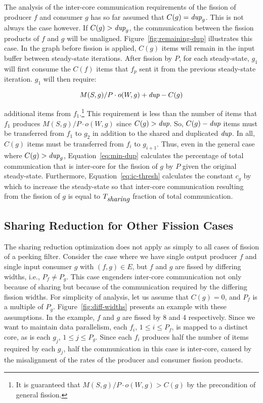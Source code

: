 The analysis of the inter-core communication requirements of the
fission of producer $f$ and consumer $g$ has so far assumed that $C(g)
= \mbox{\it dup}_g $.  This is not always the case however.  If $C(g) >
\mbox{\it dup}_g$, the communication between the fission products of $f$ and
$g$ will be unaligned.  Figure~\ref{fig:remaining-dup} illustrates
this case.  In the graph before fission is applied, $C(g)$ items will
remain in the input buffer between steady-state iterations.  After
fission by $P$, for each steady-state, $g_1$ will first consume the
$C(f)$ items that $f_p$ sent it from the previous steady-state
iteration.  $g_1$ will then require:

\[ M(S, g)/P \cdot o(W, g) + \mbox{\it dup} - C(g)\]

\noindent additional items from $f_1$.\footnote{It is guaranteed that
  $M(S, g)/P \cdot o(W, g) > C(g)$ by the precondition of general
  fission.} This requirement is less than the number of items that
$f_1$ produces $M(S, g)/P \cdot o(W, g)$ since $C(g) > \mbox{\it dup}$. So,
$C(g) - \mbox{\it dup}$ items must be transferred from $f_1$ to $g_2$ in
addition to the shared and duplicated $\mbox{\it dup}$. In all, $C(g)$ items
must be transferred from $f_i$ to $g_{i+1}$. Thus, even in the general
case where $C(g) > \mbox{\it dup}_g$, Equation~\ref{eq:min-dup} calculates
the percentage of total communication that is inter-core for the
fission of $g$ by $P$ given the original steady-state. Furthermore,
Equation~\ref{eq:ic-thresh} calculates the constant $c_g$ by which to
increase the steady-state so that inter-core communication resulting
from the fission of $g$ is equal to $T_{\mbox{\it sharing}}$ fraction of
total communication.

\subsection{Sharing Reduction for Other Fission Cases}

The sharing reduction optimization does not apply as simply to all
cases of fission of a peeking filter.  Consider the case where we have
single output producer $f$ and single input consumer $g$ with $(f,g)
\in E$, but $f$ and $g$ are fissed by differing widths, i.e., $P_f \ne
P_g$.  This case engenders inter-core communication not only because
of sharing but because of the communication required by the differing
fission widths.  For simplicity of analysis, let us assume that $C(g)
= 0$, and $P_f$ is a multiple of $P_g$. Figure~\ref{fig:diff-widths}
presents an example with these assumptions.  In the example, $f$ and
$g$ are fissed by 8 and 4 respectively.  Since we want to maintain
data parallelism, each $f_i$, $1 \le i \le P_f$, is mapped to a
distinct core, as is each $g_j$, $1 \le j \le P_g$.  Since each $f_i$
produces half the number of items required by each $g_j$, half the
communication in this case is inter-core, caused by the misalignment
of the rates of the producer and consumer fission products.

